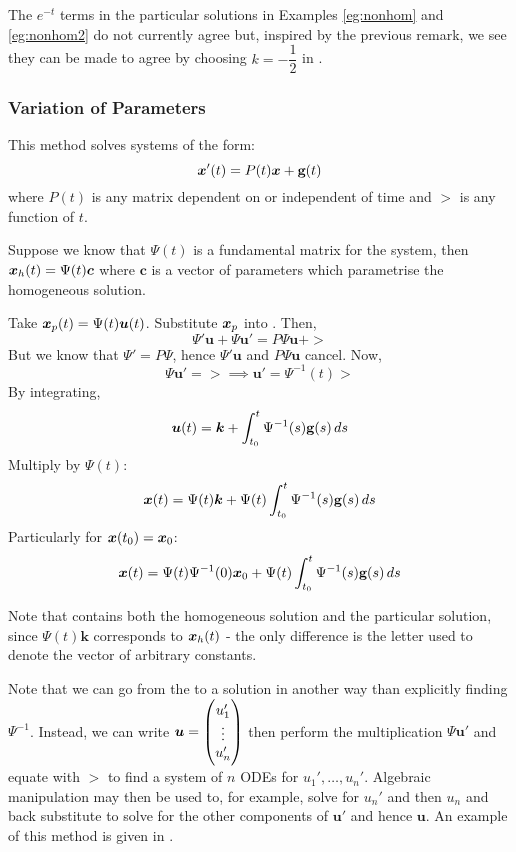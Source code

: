 \begin{remark}
	The $e^{-t}$ terms in the particular solutions in Examples \ref{eg:nonhom} and \ref{eg:nonhom2} do not currently agree but, inspired by the previous remark, we see they can be made to agree by choosing $k=-\dfrac12$ in .
\end{remark}

\subsubsection{Variation of Parameters}

This method solves systems of the form: 
\begin{equation}\label{eq1.7.10}
	\bm{x}'(t) = P(t)\bm{x} + \textbf{g}(t)
\end{equation}
where $P(t)$ is any matrix dependent on or independent of time and $\gt$ is any function of $t$.

Suppose we know that $\Psi(t)$ is a fundamental matrix for the system, then $\bm{x}_h(t) = \Psi(t)\bm{c}$ where $\bm{c}$ is a vector of parameters which parametrise the homogeneous solution.

Take $\bm{x}_p(t) = \Psi(t) \bm{u}(t)$. Substitute $\bm{x}_p$ into . Then,
\[
\Psi' \bm{u} + \Psi \bm{u}' = P\Psi \bm{u} + \gt
\]
But we know that $\Psi' = P\Psi$, hence $\Psi'\bm{u}$ and $P\Psi\bm{u}$ cancel. Now,
\begin{equation}\label{eq:varparamu}
	\Psi \bm{u}' = \gt \implies \bm{u}' = \Psi^{-1}(t) \gt
\end{equation}
By integrating, 
\[
\bm{u}(t) = \bm{k} + \int_{t_0}^t \Psi^{-1}(s) \textbf{g}(s)\,ds
\]
Multiply by $\Psi(t)$:
\begin{equation}\label{eq:varparam}
	\bm{x}(t) = \Psi(t)\bm{k} + \Psi(t) \int_{t_0}^t \Psi^{-1}(s) \textbf{g}(s)\,ds
\end{equation}
Particularly for $\bm{x}(t_0) = \bm{x}_0$:
\begin{equation}
	\bm{x}(t) = \Psi(t) \Psi^{-1}(0) \bm{x}_0 + \Psi(t) \int_{t_0}^t \Psi^{-1}(s) \textbf{g}(s)\,ds
\end{equation}

\begin{remark}
	Note that  contains both the homogeneous solution and the particular solution, since $\Psi(t) \bm{k}$ corresponds to $\bm{x}_h(t)$ - the only difference is the letter used to denote the vector of arbitrary constants.
\end{remark}

\begin{remark}
	Note that we can go from the  to a solution in another way than explicitly finding $\Psi^{-1}$. Instead, we can write $\bm{u} = \begin{pmatrix}u_1' \\ \vdots \\ u_n'\end{pmatrix}$ then perform the multiplication $\Psi \bm{u}'$ and equate with $\gt$ to find a system of $n$ ODEs for $u_1', \dots, u_n'$. Algebraic manipulation may then be used to, for example, solve for $u_n'$ and then $u_n$ and back substitute to solve for the other components of $\bm{u}'$ and hence $\bm{u}$. An example of this method is given in .
\end{remark}

